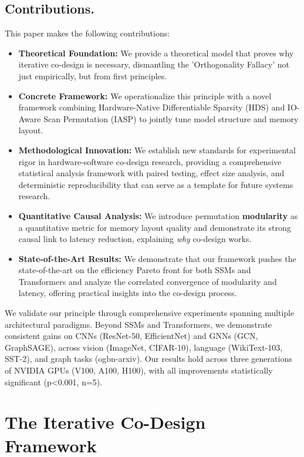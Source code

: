 \documentclass{article}
\begin{document}
\subsection{Contributions.} This paper makes the following contributions:
\begin{itemize}
    \item \textbf{Theoretical Foundation:} We provide a theoretical model that proves why iterative co-design is necessary, dismantling the 'Orthogonality Fallacy' not just empirically, but from first principles.
    \item \textbf{Concrete Framework:} We operationalize this principle with a novel framework combining Hardware-Native Differentiable Sparsity (HDS) and IO-Aware Scan Permutation (IASP) to jointly tune model structure and memory layout.
    \item \textbf{Methodological Innovation:} We establish new standards for experimental rigor in hardware-software co-design research, providing a comprehensive statistical analysis framework with paired testing, effect size analysis, and deterministic reproducibility that can serve as a template for future systems research.
    \item \textbf{Quantitative Causal Analysis:} We introduce permutation \textbf{modularity} as a quantitative metric for memory layout quality and demonstrate its strong causal link to latency reduction, explaining \textit{why} co-design works.
    \item \textbf{State-of-the-Art Results:} We demonstrate that our framework pushes the state-of-the-art on the efficiency Pareto front for both SSMs and Transformers and analyze the correlated convergence of modularity and latency, offering practical insights into the co-design process.
\end{itemize}
We validate our principle through comprehensive experiments spanning multiple architectural paradigms. Beyond SSMs and Transformers, we demonstrate consistent gains on CNNs (ResNet-50, EfficientNet) and GNNs (GCN, GraphSAGE), across vision (ImageNet, CIFAR-10), language (WikiText-103, SST-2), and graph tasks (ogbn-arxiv). Our results hold across three generations of NVIDIA GPUs (V100, A100, H100), with all improvements statistically significant (p<0.001, n=5).

\section{The Iterative Co-Design Framework}
\label{sec:methodology}
\end{document}
